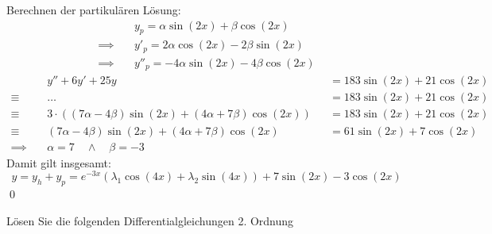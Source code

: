\documentclass[answers]{exam}
\begin{document}
\begin{questions}
\begin{parts}
\begin{solution}
            Berechnen der partikulären Lösung:
            $$
                \begin{aligned}
                                   & y_p = \alpha\sin(2x) + \beta\cos(2x)       \\
                    \implies \quad & y'_p =  2\alpha\cos(2x) - 2\beta\sin(2x)   \\
                    \implies \quad & y''_p  = -4\alpha\sin(2x) - 4\beta\cos(2x)
                \end{aligned}
            $$
            $$
                \begin{aligned}
                                   & y'' + 6y' + 25y                                                  &  & = 183\sin(2x) + 21\cos(2x) \\
                    \equiv \quad   & \ldots                                                           &  & = 183\sin(2x) + 21\cos(2x) \\
                    \equiv \quad   & 3\cdot ((7\alpha - 4\beta)\sin(2x) + (4\alpha + 7\beta)\cos(2x)) &  & = 183\sin(2x) + 21\cos(2x) \\
                    \equiv \quad   & (7\alpha - 4\beta)\sin(2x) + (4\alpha + 7\beta)\cos(2x)          &  & = 61\sin(2x) + 7\cos(2x)   \\
                    \implies \quad & \alpha = 7 \quad \land \quad \beta = -3
                \end{aligned}
            $$
            Damit gilt insgesamt:
            $$
                y = y_h + y_p = e^{-3x} \left( \lambda_1 \cos(4x) + \lambda_2 \sin(4x)\right) + 7\sin(2x) - 3\cos(2x)
            $$\qed
        \end{solution}
    \end{parts}

    \newpage
    \question
    Lösen Sie die folgenden Differentialgleichungen 2. Ordnung
    \begin{parts}

\end{parts}
\end{questions}
\end{document}
